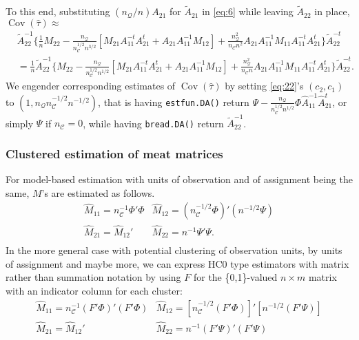\documentclass{article}
\begin{document}
To this end, substituting $(n_{\mathcal{Q}}/n)A_{21}$ for $\tilde{A}_{21}$ in \eqref{eq:6} while leaving
$\tilde{A}_{22}$ in place, $\operatorname{Cov}(\hat\tau) \approx$
  \begin{align*}
  &\tilde{A}_{22}^{-1}\{\frac{1}{n} M_{22} -
                                 \frac{n_{\mathcal{Q}}}{n_{\mathcal{C}}^{1/2}n^{3/2}}[M_{21}A_{11}^{-t}A_{21}^t
                                 + A_{21}A_{11}^{-1}M_{12}] +
                                 \frac{n_{\mathcal{Q}}^{2}}{n_{\mathcal{C}}n^{2}}A_{21}A_{11}^{-1}M_{11}A_{11}^{-t}A_{21}^{t}\}\tilde{A}_{22}^{-t}\nonumber
    \\
  &= \frac{1}{n}\tilde{A}_{22}^{-1}\{M_{22} -
                                 \frac{n_{\mathcal{Q}}}{n_{\mathcal{C}}^{1/2}n^{1/2}}[M_{21}A_{11}^{-t}A_{21}^t
                                 + A_{21}A_{11}^{-1}M_{12}] +
                                 \frac{n_{\mathcal{Q}}^{2}}{n_{\mathcal{C}}n}A_{21}A_{11}^{-1}M_{11}A_{11}^{-t}A_{21}^{t}\}\tilde{A}_{22}^{-t} .\nonumber
  \end{align*}
 We engender corresponding estimates of $\operatorname{Cov}(\hat\tau)$ by setting \eqref{eq:22}'s
 $(c_{2}, c_{1})$ to $(1, n_{\mathcal{Q}}n_{\mathcal{C}}^{-1/2}n^{-1/2})$, that is having
 \texttt{estfun.DA()} return $\Psi -
 \frac{n_{\mathcal{Q}}}{n_{\mathcal{C}}^{1/2}n^{1/2}}\Phi
 \hat{A}_{11}^{-1}\hat{A}_{21}^{t}$, or simply $\Psi$ if $n_{\mathcal{C}}=0$, while having \texttt{bread.DA()}
 return $\tilde{A}_{22}^{-1}$.


  \subsubsection{Clustered estimation of meat matrices}
For model-based estimation with units of observation and of assignment being
the same, $M$'s are estimated as follows. 
\begin{equation}\label{eq:7}
  \begin{array}{cc}
  \hat{M}_{11} =n_{\mathcal{C}}^{-1} \Phi'\Phi & \hat{M}_{12} = (n_{\mathcal{C}}^{-1/2}\Phi)'(n^{-1/2} \Psi)\\
    \hat{M}_{21} =\hat{M}_{12}' & \hat{M}_{22}= n^{-1}\Psi'\Psi.\\
    \end{array} 
  \end{equation}
  In the more general case with potential clustering of observation
units, by units of assignment and maybe more, we can express HC0
type estimators with matrix rather than summation notation by using
$F$ for the \{0,1\}-valued $n \times m$ matrix with an indicator
column for each cluster:
\begin{equation} \label{eq:8}
  \begin{array}{cc}
  \hat{M}_{11} =n_{\mathcal{C}}^{-1} (F'\Phi)'(F'\Phi) & \hat{M}_{12} = [n_{\mathcal{C}}^{-1/2} (F'\Phi)]'[n^{-1/2} (F'\Psi)]\\
    \hat{M}_{21} =\hat{M}_{12}' & \hat{M}_{22}= n^{-1}(F'\Psi)'(F'\Psi)\\
    \end{array}
  \end{equation}
  
\end{document}
